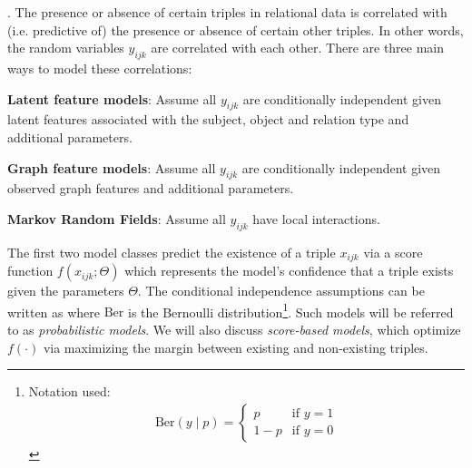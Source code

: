 \documentclass[11pt]{article}
\begin{document}
\myspace
\p {}. The presence or absence of certain triples in relational data is correlated with (i.e. predictive of) the presence or absence of certain other triples. In other words, the random variables $y_{ijk}$ are correlated with each other. There are three main ways to model these correlations:
\begin{compactenum}
	\item \textbf{Latent feature models}: Assume all $y_{ijk}$ are conditionally independent given latent features associated with the subject, object and relation type and additional parameters.
	
	\item \textbf{Graph feature models}: Assume all $y_{ijk}$ are conditionally independent given observed graph features and additional parameters.
	
	\item \textbf{Markov Random Fields}: Assume all $y_{ijk}$ have local interactions.
\end{compactenum}
The first two model classes predict the existence of a triple $x_{ijk}$ via a score function $f(x_{ijk}; \Theta)$ which represents the model's confidence that a triple exists given the parameters $\Theta$. The conditional independence assumptions can be written as
where $\text{Ber}$ is the Bernoulli distribution\footnote{Notation used:\begin{align}
	\text{Ber}(y\mid p) = \begin{cases}
	p & \text{if } y = 1 \\
	1 - p & \text{if } y = 0
	\end{cases}
	\end{align}}. Such models will be referred to as \textit{probabilistic models}. We will also discuss \textit{score-based models}, which optimize $f(\cdot)$ via maximizing the margin between existing and non-existing triples.
\end{document}
